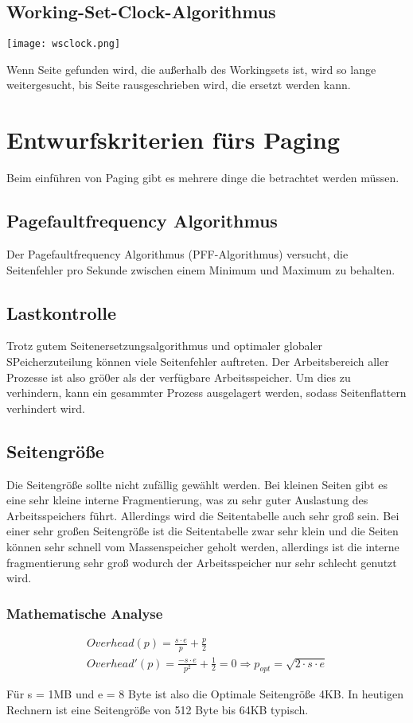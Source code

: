 \subsection{Working-Set-Clock-Algorithmus}

\texttt{[image: wsclock.png]}

Wenn Seite gefunden wird, die außerhalb des Workingsets ist, wird so lange weitergesucht, bis Seite rausgeschrieben wird, die ersetzt werden kann.

\section{Entwurfskriterien fürs Paging}

Beim einführen von Paging gibt es mehrere dinge die betrachtet werden müssen.

\subsection{Pagefaultfrequency Algorithmus}

Der Pagefaultfrequency Algorithmus (PFF-Algorithmus) versucht, die Seitenfehler pro Sekunde zwischen einem Minimum und Maximum zu behalten. 

\subsection{Lastkontrolle}

Trotz gutem Seitenersetzungsalgorithmus und optimaler globaler SPeicherzuteilung können viele Seitenfehler auftreten. Der Arbeitsbereich aller Prozesse ist also grö0er als der verfügbare Arbeitsspeicher. Um dies zu verhindern, kann ein gesammter Prozess ausgelagert werden, sodass Seitenflattern verhindert wird.

\subsection{Seitengröße}

Die Seitengröße sollte nicht zufällig gewählt werden. Bei kleinen Seiten gibt es eine sehr kleine interne Fragmentierung, was zu sehr guter Auslastung des Arbeitsspeichers führt. Allerdings wird die Seitentabelle auch sehr groß sein. Bei einer sehr großen Seitengröße ist die Seitentabelle zwar sehr klein und die Seiten können sehr schnell vom Massenspeicher geholt werden, allerdings ist die interne fragmentierung sehr groß wodurch der Arbeitsspeicher nur sehr schlecht genutzt wird.

\subsubsection*{Mathematische Analyse}

\begin{align*}
    Overhead(p) = \frac{s \cdot e}{p} + \frac{p}{2} \\
    Overhead'(p) = \frac{- s \cdot e}{p^2} + \frac{1}{2} = 0 \Rightarrow p_{opt} = \sqrt{2 \cdot s \cdot e}
\end{align*}

Für s = 1MB und e = 8 Byte ist also die Optimale Seitengröße 4KB. In heutigen Rechnern ist eine Seitengröße von 512 Byte bis 64KB typisch.